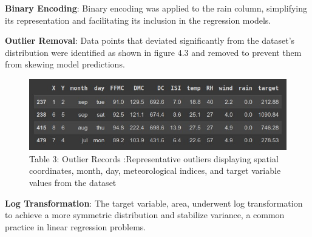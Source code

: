 \textbf{Binary Encoding}: Binary encoding was applied to the rain column, simplifying its representation and facilitating its inclusion in the regression models.

\textbf{Outlier Removal}: Data points that deviated significantly from the dataset's distribution were identified as shown in figure 4.3 and removed to prevent them from skewing model predictions.

\begin{figure}[ht]
    \centering
    \includegraphics[scale=0.9]{figures/Outlier Records.jpg}
    \caption{Table 3: Outlier Records :Representative outliers displaying spatial coordinates, month, day, meteorological indices, and target variable values from the dataset}
    \label{fig:example-02}
\end{figure}

\textbf{Log Transformation}: The target variable, area, underwent log transformation to achieve a more symmetric distribution and stabilize variance, a common practice in linear regression problems.






